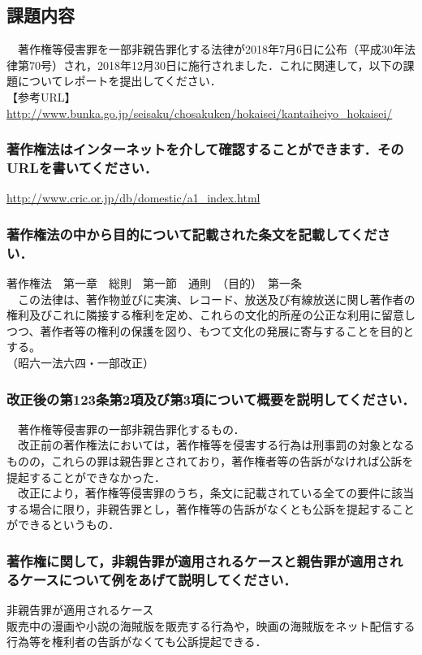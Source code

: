 

\pagestyle{fancy}

\subsection{課題内容}
　著作権等侵害罪を一部非親告罪化する法律が2018年7月6日に公布（平成30年法律第70号）され，2018年12月30日に施行されました．これに関連して，以下の課題についてレポートを提出してください．\\
【参考URL】\url{http://www.bunka.go.jp/seisaku/chosakuken/hokaisei/kantaiheiyo_hokaisei/}

\subsubsection{著作権法はインターネットを介して確認することができます．そのURLを書いてください．}
\url{http://www.cric.or.jp/db/domestic/a1_index.html}

\subsubsection{著作権法の中から目的について記載された条文を記載してください．}
著作権法　第一章　総則　第一節　通則　（目的）　第一条\\
　この法律は、著作物並びに実演、レコード、放送及び有線放送に関し著作者の権利及びこれに隣接する権利を定め、これらの文化的所産の公正な利用に留意しつつ、著作者等の権利の保護を図り、もつて文化の発展に寄与することを目的とする。\\
（昭六一法六四・一部改正）

\subsubsection{改正後の第123条第2項及び第3項について概要を説明してください．}
　著作権等侵害罪の一部非親告罪化するもの．\\
　改正前の著作権法においては，著作権等を侵害する行為は刑事罰の対象となるものの，これらの罪は親告罪とされており，著作権者等の告訴がなければ公訴を提起することができなかった．\\
　改正により，著作権等侵害罪のうち，条文に記載されている全ての要件に該当する場合に限り，非親告罪とし，著作権等の告訴がなくとも公訴を提起することができるというもの．

\subsubsection{著作権に関して，非親告罪が適用されるケースと親告罪が適用されるケースについて例をあげて説明してください．}
非親告罪が適用されるケース\\
販売中の漫画や小説の海賊版を販売する行為や，映画の海賊版をネット配信する行為等を権利者の告訴がなくても公訴提起できる．\\

